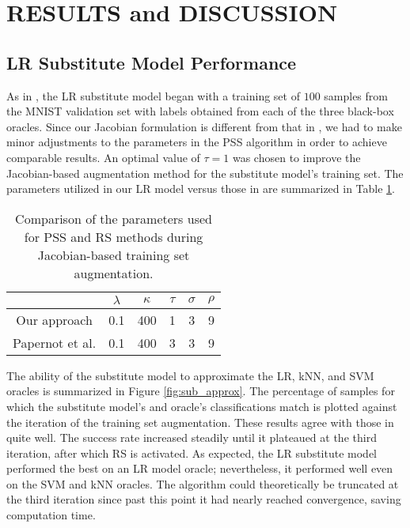 \section{RESULTS and DISCUSSION}

\subsection{LR Substitute Model Performance} \label{subsec:sub_model}

As in \cite{papernot3}, the LR substitute model began with a training set of $100$ samples from the MNIST validation set with labels obtained from each of the three black-box oracles. Since our Jacobian formulation is different from that in \cite{papernot3}, we had to make minor adjustments to the parameters in the PSS algorithm in order to achieve comparable results. An optimal value of $\tau = 1$ was chosen to improve the Jacobian-based augmentation method for the substitute model's training set. The parameters utilized in our LR model versus those in \cite{papernot3} are summarized in Table \ref{tab:params}. 

\begin{table}[h]
\begin{center}
\begin{tabular}{c|ccccc}
\toprule
& $\lambda$ & $\kappa$ & $\tau$ & $\sigma$ & $\rho$\\
\midrule \midrule
Our approach & 0.1 & 400 & 1 & 3 & 9 \\
Papernot et al. & 0.1 & 400 & 3 & 3 & 9 \\
\bottomrule
\end{tabular}
\end{center}
\caption{Comparison of the parameters used for PSS and RS methods during Jacobian-based training set augmentation.}
\label{tab:params}
\end{table}

The ability of the substitute model to approximate the LR, kNN, and SVM oracles is summarized in Figure \ref{fig:sub_approx}. The percentage of samples for which the substitute model's and oracle's classifications match is plotted against the iteration of the training set augmentation. These results agree with those in \cite{papernot3} quite well. The success rate increased steadily until it plateaued at the third iteration, after which RS is activated. As expected, the LR substitute model performed the best on an LR model oracle; nevertheless, it performed well even on the SVM and kNN oracles. The algorithm could theoretically be truncated at the third iteration since past this point it had nearly reached convergence, saving computation time.

